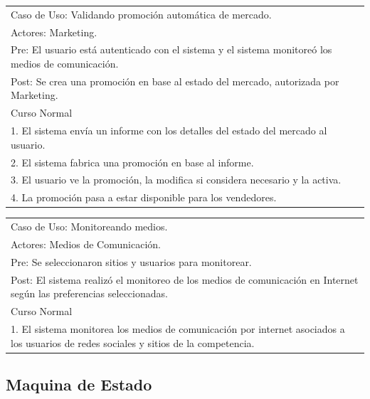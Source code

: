 \vspace{1cm}

\begin{tabular}{ | p{14cm} | }
  \hline
  Caso de Uso: Validando promoción automática de mercado. \\
  Actores: Marketing. \\
  Pre: El usuario está autenticado con el sistema y el sistema monitoreó los medios de comunicación. \\
  Post: Se crea una promoción en base al estado del mercado, autorizada por Marketing. \\
  \hline
  Curso Normal\\
  \hline
  1. El sistema envía un informe con los detalles del estado del mercado al usuario. \\
  2. El sistema fabrica una promoción en base al informe. \\
  3. El usuario ve la promoción, la modifica si considera necesario y la activa. \\
  4. La promoción pasa a estar disponible para los vendedores. \\
  \hline
\end{tabular}

\vspace{1cm}

\begin{tabular}{ | p{14cm} | }
  \hline
  Caso de Uso: Monitoreando medios.\\
  Actores: Medios de Comunicación. \\
  Pre: Se seleccionaron sitios y usuarios para monitorear. \\
  Post: El sistema realizó el monitoreo de los medios de comunicación en Internet según las preferencias seleccionadas. \\
  \hline
  Curso Normal\\
  \hline
  1. El sistema monitorea los medios de comunicación por internet asociados a los usuarios de redes sociales y sitios de la competencia. \\
  \hline
\end{tabular}

\subsection{Maquina de Estado}


